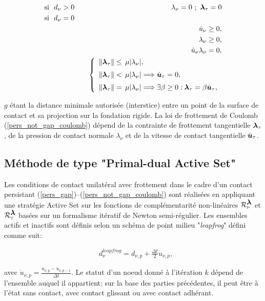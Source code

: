 \begin{eqnarray}  
&\mbox{si} \ \ d_{\nu} > 0  \quad & \lambda_{\nu} = 0 \ ;\ \blambda_{\tau} =0  \label{pers_gap} \\
&\mbox{si} \ \ d_{\nu} = 0  \quad & \\ 
&&\dot u_{\nu} \ge 0 \label{pers_not_gap},\\
&&\lambda_{\nu}\ge 0 \label{pers_not_gap_1},\\
&&\dot u_{\nu}\lambda_{\nu}= 0 \label{pers_not_gap_2},\\
&& \left\{\begin{array}{ll} \label{pers_not_gap_coulomb}
\|\blambda_{\tau}\|\le\,\mu |\lambda_{\nu}|,\\[2mm]
\|\blambda_{\tau}\|<\,\mu |\lambda_{\nu}|\Longrightarrow \dot\bu_{\tau}=0,\\[2mm]
\|\blambda_{\tau}\|=\,\mu |\lambda_{\nu}|\Longrightarrow \exists \beta\ge 0: \blambda_{\tau}=\beta \dot\bu_{\tau}, \end{array}\right .
 \end{eqnarray}
 
$g$ étant la distance minimale autorisée (interstice) entre un point de la surface de contact et sa projection sur la fondation rigide. La loi de frottement de Coulomb (\ref{pers_not_gap_coulomb}) dépend de la contrainte de  frottement  tangentielle $\mbox{\boldmath{$\lambda$}}_{\tau}$,  de  la  pression  de  contact  normale  $\lambda_{\nu}$ et de la  vitesse  de  contact tangentielle $\dot{\mbox{\boldmath{$u$}}}_{\tau}$.

\subsection{Méthode de type "Primal-dual Active Set"}\label{Activeset_type}

Les conditions de contact unilatéral avec frottement dans le cadre d'un contact persistant (\ref{pers_gap})--(\ref{pers_not_gap_coulomb}) sont réalisées en appliquant une stratégie Active Set sur les fonctions de complémentarité non-linéaires ${\cal R}_{\nu}^{\mbox{\boldmath{$\lambda$}}}$ et ${\cal R}_{\tau}^{\mbox{\boldmath{$\lambda$}}}$ basées sur un formalisme itératif de Newton semi-régulier. Les ensembles actifs et inactifs sont définis selon un schéma de point milieu "\textit{leapfrog}" défini comme suit:

\begin{align*}
&d_{\nu}^{leapfrog} = d_{\nu,p} + \frac{\Delta{t}}{2} \dot u_{\nu,p},
\end{align*}

\noindent avec $\dot u_{\nu,p} = \frac{u_{\nu,p}-u_{\nu,p-1}}{\Delta{t}}$. Le statut d'un noeud donné à l'itération $k$ dépend de l'ensemble auquel il appartient; sur la base des parties précédentes, il peut être à l'état sans contact, avec contact glissant ou avec contact adhérant.\\

